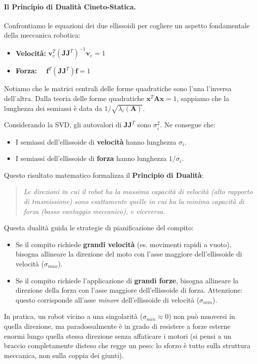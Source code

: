 \documentclass[11pt, a4paper]{report}
\begin{document}
\paragraph{Il Principio di Dualità Cineto-Statica.}
Confrontiamo le equazioni dei due ellissoidi per cogliere un aspetto fondamentale della meccanica robotica:
\begin{itemize}
    \item \textbf{Velocità:} $\bm{v}_e^T \left( \bm{J}\bm{J}^T \right)^{-1} \bm{v}_e = 1$
    \item \textbf{Forza:} $\quad \bm{f}^T \left( \bm{J}\bm{J}^T \right) \bm{f} = 1$
\end{itemize}
Notiamo che le matrici centrali delle forme quadratiche sono l'una l'inversa dell'altra.
Dalla teoria delle forme quadratiche $\bm{x}^T\bm{A}\bm{x}=1$, sappiamo che la lunghezza dei semiassi è data da $1/\sqrt{\lambda_i(\bm{A})}$.

Considerando la SVD, gli autovalori di $\bm{J}\bm{J}^T$ sono $\sigma_i^2$. Ne consegue che:
\begin{itemize}
    \item I semiassi dell'ellissoide di \textbf{velocità} hanno lunghezza $\sigma_i$.
    \item I semiassi dell'ellissoide di \textbf{forza} hanno lunghezza $1/\sigma_i$.
\end{itemize}
Questo risultato matematico formalizza il \textbf{Principio di Dualità}:
\begin{quote}
    \emph{Le direzioni in cui il robot ha la massima capacità di velocità (alto rapporto di trasmissione) sono esattamente quelle in cui ha la minima capacità di forza (basso vantaggio meccanico), e viceversa.}
\end{quote}

Questa dualità guida le strategie di pianificazione del compito:
\begin{itemize}
    \item Se il compito richiede \textbf{grandi velocità} (es. movimenti rapidi a vuoto), bisogna allineare la direzione del moto con l'asse maggiore dell'ellissoide di velocità ($\sigma_{max}$).
    \item Se il compito richiede l'applicazione di \textbf{grandi forze}, bisogna allineare la direzione della forza con l'asse maggiore dell'ellissoide di forza. Attenzione: questo corrisponde all'asse \textit{minore} dell'ellissoide di velocità ($\sigma_{min}$).
\end{itemize}
In pratica, un robot vicino a una singolarità ($\sigma_{min} \approx 0$) non può muoversi in quella direzione, ma paradossalmente è in grado di resistere a forze esterne enormi lungo quella stessa direzione senza affaticare i motori (si pensi a un braccio completamente disteso che regge un peso: lo sforzo è tutto sulla struttura meccanica, non sulla coppia dei giunti).
\end{document}
